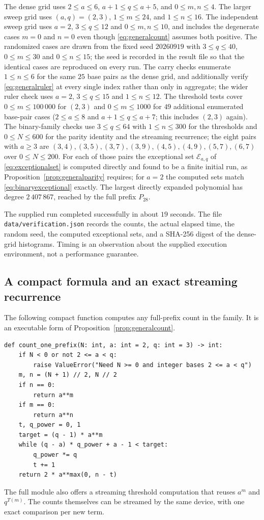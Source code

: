 \documentclass[11pt,letterpaper]{article}
\numberwithin{equation}{section}
\theoremstyle{definition}
\theoremstyle{remark}
\begin{document}
The dense grid uses $2\le a\le6$, $a+1\le q\le a+5$, and
$0\le m,n\le4$. The larger sweep grid uses $(a,q)=(2,3)$,
$1\le m\le24$, and $1\le n\le16$. The independent sweep grid uses $a=2$,
$3\le q\le12$ and $0\le m,n\le10$, and includes the degenerate cases
$m=0$ and $n=0$ even though \eqref{eq:generalcount} assumes both positive.
The randomized cases are drawn from the fixed seed $20260919$ with
$3\le q\le40$, $0\le m\le30$ and $0\le n\le15$; the seed is recorded in the
result file so that the identical cases are reproduced on every run.
The carry checks enumerate $1\le n\le6$ for the same $25$ base pairs as the
dense grid, and additionally verify \eqref{eq:generalruler} at every single
index rather than only in aggregate; the wider ruler check uses $a=2$,
$3\le q\le15$ and $1\le n\le12$.
The threshold tests cover $0\le m\le100\,000$ for $(2,3)$ and
$0\le m\le1000$ for $49$ additional enumerated base-pair cases
($2\le a\le8$ and $a+1\le q\le a+7$; this includes $(2,3)$ again).
The binary-family checks use $3\le q\le64$ with $1\le n\le300$ for the
thresholds and $0\le N\le600$ for the parity identity and the streaming
recurrence; the eight pairs with $a\ge3$ are
$(3,4),(3,5),(3,7),(3,9),(4,5),(4,9),(5,7),(6,7)$ over $0\le N\le200$.
For each of those pairs the exceptional set $\mathcal E_{a,q}$ of
\eqref{eq:exceptionalset} is computed directly and found to be a finite
initial run, as Proposition~\ref{prop:generalparity} requires; for $a=2$
the computed sets match \eqref{eq:binaryexceptional} exactly.
The largest directly expanded polynomial has degree $2\,407\,867$, reached
by the full prefix $P_{28}$.

The supplied run completed successfully in about $19$ seconds. The file
\texttt{data/verification.json} records the counts, the actual elapsed time,
the random seed, the computed exceptional sets, and a SHA-256 digest of the
dense-grid histograms. Timing is an observation about the supplied execution
environment, not a performance guarantee.

\subsection{A compact formula and an exact streaming recurrence}
\label{sec:streaming}
The following compact function computes any full-prefix count in the
family. It is an executable form of Proposition~\ref{prop:generalcount}.
\begin{lstlisting}
def count_one_prefix(N: int, a: int = 2, q: int = 3) -> int:
    if N < 0 or not 2 <= a < q:
        raise ValueError("Need N >= 0 and integer bases 2 <= a < q")
    m, n = (N + 1) // 2, N // 2
    if n == 0:
        return a**m
    if m == 0:
        return a**n
    t, q_power = 0, 1
    target = (q - 1) * a**m
    while (q - a) * q_power + a - 1 < target:
        q_power *= q
        t += 1
    return 2 * a**max(0, n - t)
\end{lstlisting}
The full module also offers a streaming threshold computation that reuses
$a^m$ and $q^{T(m)}$. The counts themselves can be streamed by the same
device, with one exact comparison per new term.
\end{document}
